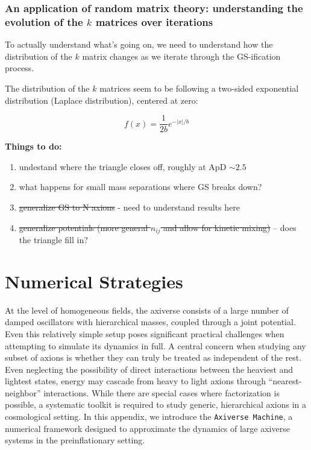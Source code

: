 \documentclass[11pt]{article}
\begin{document}
\subsubsection{An application of random matrix theory: understanding the evolution of the $k$ matrices over iterations}


To actually understand what's going on, we need to understand how the distribution of the $k$ matrix changes as we iterate through the GS-ification process.

The distribution of the $k$ matrices seem to be following a two-sided exponential distribution (Laplace distribution), centered at zero:

\begin{equation}
    \label{eq:laplace-dist}
    f(x) = \frac{1}{2b}e^{-|x|/b}
\end{equation}

\color{red}\noindent \textbf{Things to do:}
\begin{enumerate}
    \item undestand where the triangle closes off, roughly at ApD $\sim 2.5$
    \item what happens for small mass separations where GS breaks down?
    \item \st{generalize GS to N axions} - need to understand results here
    \item \st{generalize potentials (more general $n_{ij}$ and allow for kinetic mixing) }– does the triangle fill in?
\end{enumerate}\color{black}

\appendix
\section{Numerical Strategies}

At the level of homogeneous fields, the axiverse consists of a large number of damped oscillators with hierarchical masses, coupled through a joint potential. Even this relatively simple setup poses significant practical challenges when attempting to simulate its dynamics in full. A central concern when studying any subset of axions is whether they can truly be treated as independent of the rest. Even neglecting the possibility of direct interactions between the heaviest and lightest states, energy may cascade from heavy to light axions through ``nearest-neighbor'' interactions. While there are special cases where factorization is possible, a systematic toolkit is required to study generic, hierarchical axions in a cosmological setting. In this appendix, we introduce the \texttt{Axiverse Machine}, a numerical framework designed to approximate the dynamics of large axiverse systems in the preinflationary setting. 
\end{document}

